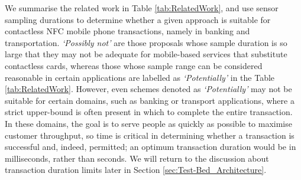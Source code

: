 \documentclass{article}
\begin{document}
  \begin{table}[ht]
	\centering
	\caption{Related Work in Sensors as Anti-Relay Mechanism}
	\label{tab:RelatedWork}
\end{table}

We summarise the related work in Table \ref{tab:RelatedWork}, and use sensor sampling durations to determine whether a given approach is suitable for contactless NFC mobile phone transactions, namely in banking and transportation.  \emph{`Possibly not'} are those proposals whose sample duration is so large that they may not be adequate for mobile-based services that substitute contactless cards, whereas those whose sample range can be considered reasonable in certain applications are labelled as \emph{`Potentially'} in the Table \ref{tab:RelatedWork}. However, even schemes denoted as \emph{`Potentially'} may not be suitable for certain domains, such as banking or transport applications, where a strict upper-bound is often present in which to complete the entire transaction.  In these domains, the goal is to serve people as quickly as possible to maximise customer throughput, so time is critical in determining whether a transaction is successful and, indeed, permitted; an optimum transaction duration would be in milliseconds, rather than seconds.  We will return to the discussion about transaction duration limits later in Section \ref{sec:Test-Bed_Architecture}. 
\end{document}
